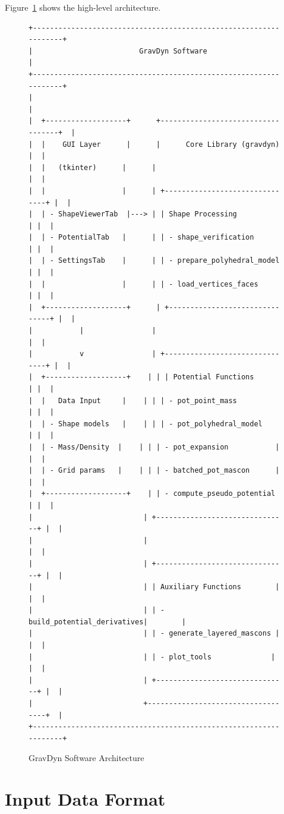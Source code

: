 \documentclass[a4paper,12pt]{article}
\begin{document}
Figure~\ref{fig:architecture} shows the high-level architecture.

\begin{figure}[htbp]
\centering
\scriptsize
\begin{verbatim}
+------------------------------------------------------------------+
|                         GravDyn Software                           |
+------------------------------------------------------------------+
|                                                                  |
|  +-------------------+      +-----------------------------------+  |
|  |    GUI Layer      |      |      Core Library (gravdyn)         |  |
|  |   (tkinter)      |      |                                   |  |
|  |                  |      | +-------------------------------+ |  |
|  | - ShapeViewerTab  |---> | | Shape Processing               | |  |
|  | - PotentialTab   |      | | - shape_verification           | |  |
|  | - SettingsTab    |      | | - prepare_polyhedral_model     | |  |
|  |                  |      | | - load_vertices_faces         | |  |
|  +-------------------+      | +-------------------------------+ |  |
|           |                |                                   |  |
|           v                | +-------------------------------+ |  |
|  +-------------------+    | | | Potential Functions           | |  |
|  |   Data Input     |    | | | - pot_point_mass           | |  |
|  | - Shape models   |    | | | - pot_polyhedral_model    | |  |
|  | - Mass/Density  |    | | | - pot_expansion           | |  |
|  | - Grid params   |    | | | - batched_pot_mascon      | |  |
|  +-------------------+    | | - compute_pseudo_potential | |  |
|                          | +-------------------------------+ |  |
|                          |                                   |  |
|                          | +-------------------------------+ |  |
|                          | | Auxiliary Functions        | |  |
|                          | | - build_potential_derivatives|        |
|                          | | - generate_layered_mascons | |  |
|                          | | - plot_tools              | |  |
|                          | +-------------------------------+ |  |
|                          +-----------------------------------+  |
+------------------------------------------------------------------+
\end{verbatim}
\caption{GravDyn Software Architecture}
\label{fig:architecture}
\end{figure}

\section{Input Data Format}
\end{document}
